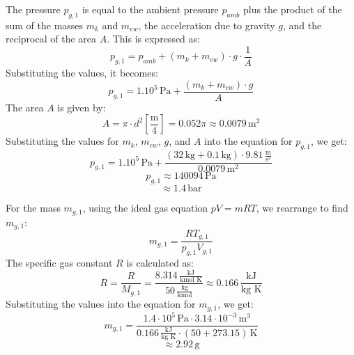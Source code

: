 The pressure \( p_{g,1} \) is equal to the ambient pressure \( p_{amb} \) plus the product of the sum of the masses \( m_k \) and \( m_{ew} \), the acceleration due to gravity \( g \), and the reciprocal of the area \( A \). This is expressed as:
\[ p_{g,1} = p_{amb} + (m_k + m_{ew}) \cdot g \cdot \frac{1}{A} \]
Substituting the values, it becomes:
\[ p_{g,1} = 1.10^5 \, \text{Pa} + \frac{(m_k + m_{ew}) \cdot g}{A} \]
The area \( A \) is given by:
\[ A = \pi \cdot d^2 \left[ \frac{\text{m}}{4} \right] = 0.052 \pi \approx 0.0079 \, \text{m}^2 \]
Substituting the values for \( m_k \), \( m_{ew} \), \( g \), and \( A \) into the equation for \( p_{g,1} \), we get:
\[ p_{g,1} = 1.10^5 \, \text{Pa} + \frac{(32 \, \text{kg} + 0.1 \, \text{kg}) \cdot 9.81 \, \frac{\text{m}}{\text{s}^2}}{0.0079 \, \text{m}^2} \]
\[ p_{g,1} \approx 140094 \, \text{Pa} \]
\[ \approx 1.4 \, \text{bar} \]

For the mass \( m_{g,1} \), using the ideal gas equation \( pV = mRT \), we rearrange to find \( m_{g,1} \):
\[ m_{g,1} = \frac{RT_{g,1}}{p_{g,1} V_{g,1}} \]
The specific gas constant \( R \) is calculated as:
\[ R = \frac{R}{M_{g,1}} = \frac{8.314 \, \frac{\text{kJ}}{\text{kmol K}}}{50 \, \frac{\text{kg}}{\text{kmol}}} \approx 0.166 \, \frac{\text{kJ}}{\text{kg K}} \]
Substituting the values into the equation for \( m_{g,1} \), we get:
\[ m_{g,1} = \frac{1.4 \cdot 10^5 \, \text{Pa} \cdot 3.14 \cdot 10^{-3} \, \text{m}^3}{0.166 \, \frac{\text{kJ}}{\text{kg K}} \cdot (50 + 273.15) \, \text{K}} \]
\[ \approx 2.92 \, \text{g} \]